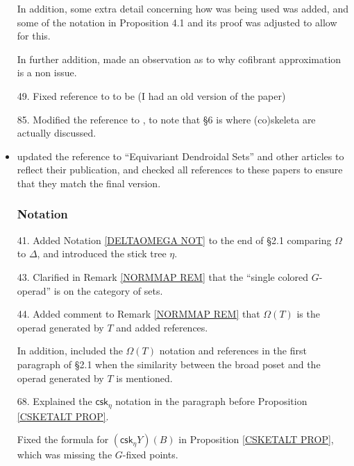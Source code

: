 \documentclass{article}
\begin{document}
\begin{itemize}
      In addition, some extra detail concerning how \cite[Prop. 3.3.18]{Hir03} was being used was added, and some of the notation in Proposition 4.1 and its proof was adjusted to allow for this.
      
      In further addition, made an observation as to why cofibrant approximation is a non issue.
      
\item[49.] Fixed reference to \cite[Thm. 3.3.8]{Hir03} to be \cite[Thm. 3.2.13]{Hir03} (I had an old version of the paper)
      
\item[85.] Modified the reference \cite[\S 4]{BM11} to \cite[\S 4,\S 6]{BM11}, to note that \S 6 is where (co)skeleta are actually discussed.
      
\item updated the reference to ``Equivariant Dendroidal Sets'' and other articles to reflect their publication,
      and checked all references to these papers to ensure that they match the final version. %




      \subsubsection*{Notation}
\item[41.] Added Notation \ref{DELTAOMEGA NOT} to the end of \S 2.1 comparing $\Omega$ to $\Delta$, and introduced the stick tree $\eta$. %

      
\item[43.] Clarified in Remark \ref{NORMMAP REM} that the ``single colored $G$-operad'' is on the category of sets. %

      
\item[44.] Added comment to Remark \ref{NORMMAP REM} that $\Omega(T)$ is the operad generated by $T$ and added references. %

      In addition, included the $\Omega(T)$ notation and references in the first paragraph of \S 2.1 when the similarity between the broad poset and the operad generated by $T$ is mentioned. %

      
\item[68.] Explained the $\mathsf{csk}_{\eta}$ notation in the paragraph before Proposition \ref{CSKETALT PROP}. %

      Fixed the formula for $(\mathsf{csk}_{\eta} Y)(B)$ in Proposition \ref{CSKETALT PROP}, which was missing the $G$-fixed points.

                           
\end{itemize}
\end{document}
